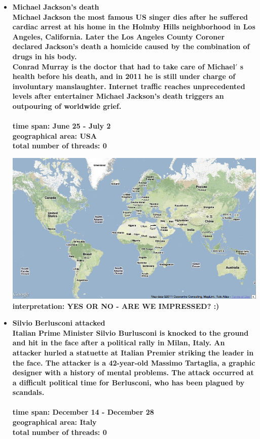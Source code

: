 \documentclass[11pt,a4paper,english]{article}
\begin{document}
\begin{itemize}
					\item \bf Michael Jackson's death \rm
						\\ Michael Jackson the most famous US singer dies after he suffered cardiac arrest at his home in the Holmby Hills neighborhood in Los Angeles, California. Later the Los Angeles County Coroner declared Jackson's death a homicide caused by the combination of drugs in his body.
\\ Conrad Murray is the doctor that had to take care of Michael$\prime$ s health before his death, and in 2011 he is still under charge of involuntary manslaughter. Internet traffic reaches unprecedented levels after entertainer Michael Jackson's death triggers an outpouring of worldwide grief.
						\\\\ \bf time span: \rm June 25 - July 2
						\\ \bf geographical area: \rm USA
						\\ \bf total number of threads: \rm 0
						
						\includegraphics[width=130mm]{img/2005-1}
						\bf interpretation: \rm YES OR NO - ARE WE IMPRESSED? :)
						
						
						
					\item \bf Silvio Berlusconi attacked \rm
						\\ Italian Prime Minister Silvio Burlusconi is knocked to the ground and hit in the face after a political rally in Milan, Italy. An attacker hurled a statuette at Italian Premier striking the leader in the face. The attacker is a 42-year-old Massimo Tartaglia, a graphic designer with a history of mental problems. The attack occurred at a difficult political time for Berlusconi, who has been plagued by scandals.
						\\\\ \bf time span: \rm December 14 - December 28
						\\ \bf geographical area: \rm Italy
						\\ \bf total number of threads: \rm 0
						

\end{itemize}
\end{document}
